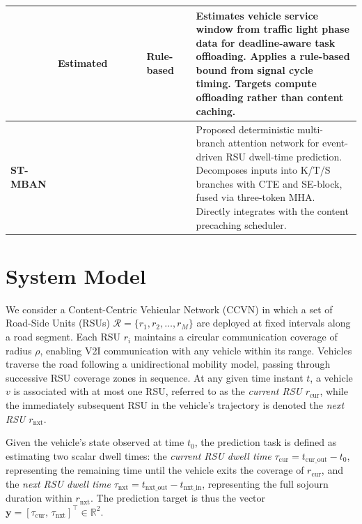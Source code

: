 \documentclass[journal]{IEEEtran}
\begin{document}
\begin{table}[!t]
\begin{tabular}{|C{1.5cm}|C{1.3cm}|C{1.3cm}|C{1.3cm}|C{1.4cm}|C{1.3cm}|C{1.3cm}|L{5.2cm}|}
\hline
\cite{TaskMig2023} & Estimated &  &  &  & Rule-based &  &
{\small Estimates vehicle service window from traffic light phase data for deadline-aware task offloading. Applies a rule-based bound from signal cycle timing. Targets compute offloading rather than content caching.} \\
\hline
\textbf{ST-MBAN} &  &  &  &  &  &  &
{\small Proposed deterministic multi-branch attention network for event-driven RSU dwell-time prediction. Decomposes inputs into K/T/S branches with CTE and SE-block, fused via three-token MHA. Directly integrates with the content precaching scheduler.} \\
\hline
\end{tabular}
\end{table}


\section{System Model} \label{sec:system}

We consider a Content-Centric Vehicular Network (CCVN) in which a set of Road-Side Units (RSUs) $\mathcal{R} = \{r_1, r_2, \ldots, r_M\}$ are deployed at fixed intervals along a road segment.
Each RSU $r_i$ maintains a circular communication coverage of radius $\rho$, enabling V2I communication with any vehicle within its range.
Vehicles traverse the road following a unidirectional mobility model, passing through successive RSU coverage zones in sequence.
At any given time instant $t$, a vehicle $v$ is associated with at most one RSU, referred to as the \emph{current RSU} $r_\text{cur}$, while the immediately subsequent RSU in the vehicle's trajectory is denoted the \emph{next RSU} $r_\text{nxt}$.

Given the vehicle's state observed at time $t_0$, the prediction task is defined as estimating two scalar dwell times: the \emph{current RSU dwell time} $\tau_\text{cur} = t_\text{cur\_out} - t_0$, representing the remaining time until the vehicle exits the coverage of $r_\text{cur}$, and the \emph{next RSU dwell time} $\tau_\text{nxt} = t_\text{nxt\_out} - t_\text{nxt\_in}$, representing the full sojourn duration within $r_\text{nxt}$.
The prediction target is thus the vector $\mathbf{y} = [\tau_\text{cur},\, \tau_\text{nxt}]^\top \in \mathbb{R}^2$.
\end{document}
